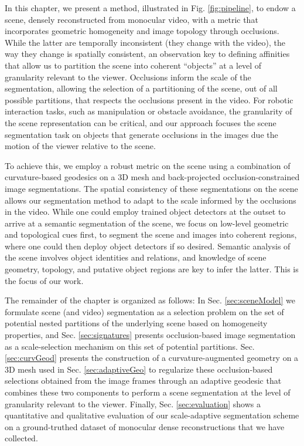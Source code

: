In this chapter, we present a method, illustrated in Fig. \ref{fig:pipeline}, to endow a scene, densely reconstructed from monocular video, 
with a metric that incorporates geometric homogeneity and image topology through occlusions. While the latter are temporally inconsistent (they change with the
video), the way they change is spatially consistent, an observation key to defining affinities that allow us to partition the scene into coherent ``objects'' at a level of granularity relevant to the viewer. Occlusions inform the scale of the segmentation, allowing the selection of a partitioning of the scene, out of all possible partitions, that respects the occlusions present in the video. For robotic interaction tasks, such as manipulation or obstacle avoidance, the granularity of the scene representation can be critical, and our approach focuses the scene segmentation task on objects that generate occlusions in the images due the motion of the viewer relative to the scene.  

To achieve this, we employ a robust metric on the scene using a combination of curvature-based geodesics on a 3D mesh and back-projected occlusion-constrained image segmentations. The spatial consistency of these segmentations on the scene allows our segmentation method to adapt to the scale informed by the occlusions in the video. While one could employ trained object detectors at the outset to arrive at a semantic segmentation of the scene, we focus on low-level geometric and topological cues
first, to segment the scene and images into coherent regions, where one could then deploy object detectors if so desired. Semantic analysis of the scene involves object identities and relations, and knowledge
of scene geometry, topology, and putative object regions are key to infer the latter. This is the focus of our work.

The remainder of the chapter is organized as follows: In Sec. \ref{sec:sceneModel} we formulate scene (and video) segmentation as a selection problem on the set of potential nested partitions of the underlying scene based on homogeneity properties, and Sec. \ref{sec:signatures} presents occlusion-based image segmentation as a scale-selection mechanism on this set of potential partitions. Sec. \ref{sec:curvGeod} 
presents the construction of a curvature-augmented geometry on a 3D mesh used in Sec. \ref{sec:adaptiveGeo} to regularize these occlusion-based 
selections obtained from the image frames through an adaptive geodesic 
that combines these two components to perform a scene segmentation at the level of granularity relevant to the viewer. Finally, Sec. \ref{sec:evaluation} shows a quantitative and qualitative evaluation of our scale-adaptive segmentation scheme on a ground-truthed dataset of monocular dense reconstructions that we have collected. 

